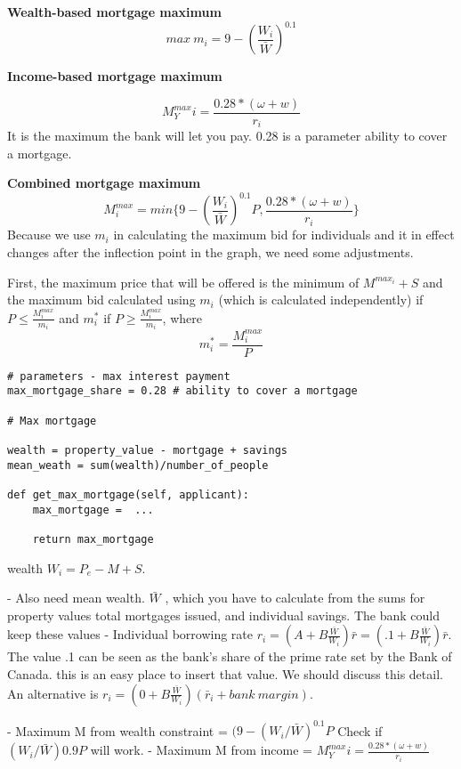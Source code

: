 \textbf{Wealth-based  mortgage maximum} 
 \[max\ m_i = 9-\left(\frac{W_i}{\bar W}\right)^{0.1} \]


\textbf{Income-based  mortgage maximum}

\[M^{max}_Yi = \frac{0.28*(\omega+w)}{r_i}\] It is the maximum the bank will let you pay.  0.28 is a parameter \gls{ability to cover a mortgage}.
 
\textbf{Combined  mortgage maximum}
\[ M_i^{max} = min \{9-\left(\frac{W_i}{\bar W}\right)^{0.1}P,  \frac{0.28*(\omega+w)}{r_i} \}\]
Because we use $m_i$ in calculating the maximum bid for individuals and it in effect changes after the inflection point in the graph, we need some adjustments. 

First, the maximum price that will be offered is the minimum of $M^{max_i} +S$ and the maximum bid calculated using $m_i$ (which is calculated independently) if 
$P\le \frac{M_i^{max}}{m_i}$ 
and $m_i^*$ if 
$P\ge \frac{M_i^{max}}{m_i}$, where 
\[m_i^*=\frac{M_i^{max}}{P}\]

\begin{lstlisting}
# parameters - max interest payment 
max_mortgage_share = 0.28 # ability to cover a mortgage

# Max mortgage

wealth = property_value - mortgage + savings
mean_weath = sum(wealth)/number_of_people

def get_max_mortgage(self, applicant):
    max_mortgage =  ...
    
    return max_mortgage
\end{lstlisting}

wealth $W_i = P_e-M+S$.  

- Also need mean wealth. $\bar W$ , which you have to calculate from the sums for property values total mortgages issued, and individual savings. The bank could keep these values
- Individual borrowing rate 
$r_i = (A + B \frac{\bar{W}}{W_i})\bar r=(.1 + B \frac{\bar{W}}{W_i})\bar r$.
The value .1 can be seen as the bank's share of the prime rate set by the Bank of Canada. this is an easy place to insert that value. We should discuss this detail. An alternative is
$r_i = (0 + B \frac{\bar{W}}{W_i})(\bar r_i+ bank\ margin)$.

- Maximum M  from wealth constraint = $(9-(W_i/\bar W)^{0.1}P$
  Check if $(W_i/\bar W)0.9P$ will work. 
- Maximum M  from income = $M^{max}_Yi = \frac{0.28*(\omega+w)}{r_i}$ 


